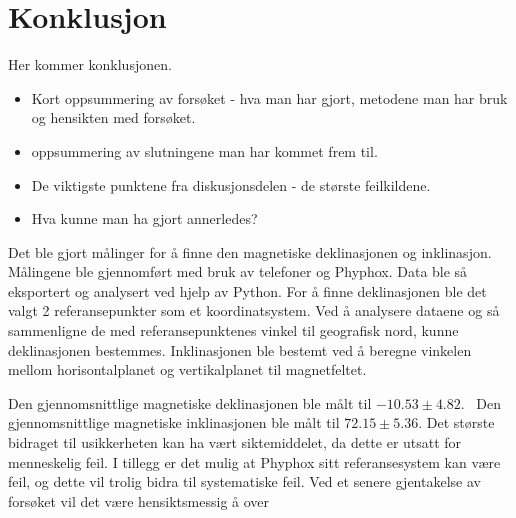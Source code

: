 \section{Konklusjon}
Her kommer konklusjonen.

\begin{itemize}
    \item Kort oppsummering av forsøket - hva man har gjort, metodene man har bruk og hensikten med forsøket. 
    \item oppsummering av slutningene man har kommet frem til.
    \item De viktigste punktene fra diskusjonsdelen - de største feilkildene. 
    \item Hva kunne man ha gjort annerledes?
\end{itemize}

Det ble gjort målinger for å finne den magnetiske deklinasjonen og inklinasjon. Målingene ble gjennomført med bruk av telefoner og Phyphox. Data ble så eksportert og analysert ved hjelp av Python. For å finne deklinasjonen ble det valgt 2 referansepunkter som et koordinatsystem. Ved å analysere dataene og så sammenligne de med referansepunktenes vinkel til geografisk nord, kunne deklinasjonen bestemmes. Inklinasjonen ble bestemt ved å beregne vinkelen mellom horisontalplanet og vertikalplanet til magnetfeltet. 

Den gjennomsnittlige magnetiske deklinasjonen ble målt til $-10.53 \pm 4.82$\textdegree. \ Den gjennomsnittlige magnetiske inklinasjonen ble målt til $72.15\pm5.36$\textdegree. Det største bidraget til usikkerheten kan ha vært siktemiddelet, da dette er utsatt for menneskelig feil. I tillegg er det mulig at Phyphox sitt referansesystem kan være feil, og dette vil trolig bidra til systematiske feil. Ved et senere gjentakelse av forsøket vil det være hensiktsmessig å over      
